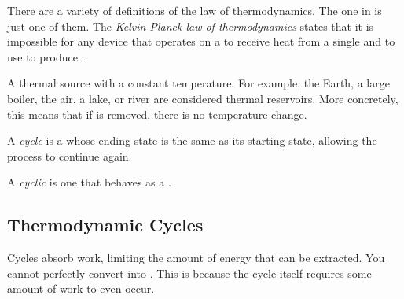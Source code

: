 \begin{definition}\label{def:Kelvin_Planck-2nd_Law_Thermo}
  There are a variety of definitions of the  law of thermodynamics.
  The one in  is just one of them.
  The \emph{Kelvin-Planck  law of thermodynamics} states that it is impossible for any device that operates on a  to receive heat from a single  and to use to produce .

  \begin{remark}\label{rmk:Thermal_Reservoir}
    A thermal source with a constant temperature.
    For example, the Earth, a large boiler, the air, a lake, or river are considered thermal reservoirs.
    More concretely, this means that if  is removed, there is no temperature change.
  \end{remark}
\end{definition}

\begin{definition}[Cycle]\label{def:Cycle}
  A \emph{cycle} is a  whose ending state is the same as its starting state, allowing the process to continue again.

  \begin{remark}[Cyclic]\label{rmk:Cyclic}
    A \emph{cyclic}  is one that behaves as a .
  \end{remark}
\end{definition}

\subsection{Thermodynamic Cycles}\label{subsec:Thermodynamic_Cycles}
Cycles absorb work, limiting the amount of energy that can be extracted.
You cannot perfectly convert  into .
This is because the cycle itself requires some amount of work to even occur.


